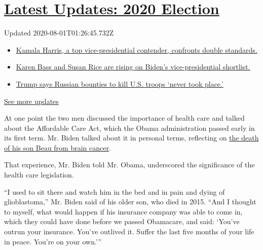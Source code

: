 \hypertarget{latest-updates-2020-election}{%
\section{\texorpdfstring{\href{https://www.nytimes.com/2020/07/31/us/elections/biden-vs-trump.html?action=click\&pgtype=Article\&state=default\&region=MAIN_CONTENT_1\&context=storylines_live_updates}{Latest
Updates: 2020
Election}}{Latest Updates: 2020 Election}}\label{latest-updates-2020-election}}

Updated 2020-08-01T01:26:45.732Z

\begin{itemize}
\tightlist
\item
  \href{https://www.nytimes.com/2020/07/31/us/elections/biden-vs-trump.html?action=click\&pgtype=Article\&state=default\&region=MAIN_CONTENT_1\&context=storylines_live_updates\#link-29fdff45}{Kamala
  Harris, a top vice-presidential contender, confronts double
  standards.}
\item
  \href{https://www.nytimes.com/2020/07/31/us/elections/biden-vs-trump.html?action=click\&pgtype=Article\&state=default\&region=MAIN_CONTENT_1\&context=storylines_live_updates\#link-13ec3d9c}{Karen
  Bass and Susan Rice are rising on Biden's vice-presidential
  shortlist.}
\item
  \href{https://www.nytimes.com/2020/07/31/us/elections/biden-vs-trump.html?action=click\&pgtype=Article\&state=default\&region=MAIN_CONTENT_1\&context=storylines_live_updates\#link-49e9a016}{Trump
  says Russian bounties to kill U.S. troops `never took place.'}
\end{itemize}

\href{https://www.nytimes.com/2020/07/31/us/elections/biden-vs-trump.html?action=click\&pgtype=Article\&state=default\&region=MAIN_CONTENT_1\&context=storylines_live_updates}{See
more updates}

At one point the two men discussed the importance of health care and
talked about the Affordable Care Act, which the Obama administration
passed early in its first term. Mr. Biden talked about it in personal
terms, reflecting on
\href{https://www.nytimes.com/2015/05/31/us/politics/joseph-r-biden-iii-vice-presidents-son-beau-dies-at-46.html}{the
death of his son Beau from brain cancer}.

That experience, Mr. Biden told Mr. Obama, underscored the significance
of the health care legislation.

``I used to sit there and watch him in the bed and in pain and dying of
glioblastoma,'' Mr. Biden said of his older son, who died in 2015. ``And
I thought to myself, what would happen if his insurance company was able
to come in, which they could have done before we passed Obamacare, and
said: `You've outrun your insurance. You've outlived it. Suffer the last
five months of your life in peace. You're on your own.'''

